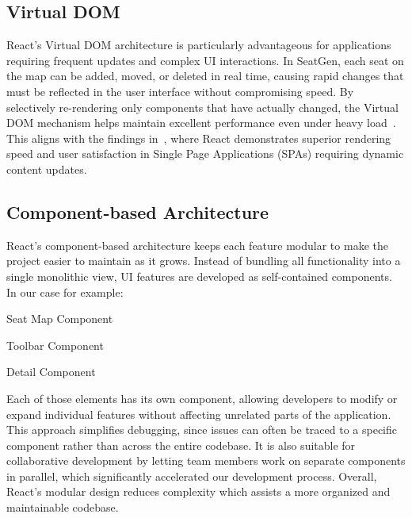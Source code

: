 \subsection{Virtual DOM}
React’s Virtual DOM architecture is particularly advantageous for applications requiring frequent updates and complex UI interactions. In SeatGen, each seat on the map can be added, moved, or deleted in real time, causing rapid changes that must be reflected in the user interface without compromising speed. By selectively re-rendering only components that have actually changed, the Virtual DOM mechanism helps maintain excellent performance even under heavy load~\cite{ReactVirtualDOM}. This aligns with the findings in~\cite{SPAComp}, where React demonstrates superior rendering speed and user satisfaction in Single Page Applications (SPAs) requiring dynamic content updates.

\subsection{Component-based Architecture}
React’s component-based architecture keeps each feature modular to make the project easier to maintain as it grows. Instead of bundling all functionality into a single monolithic view, UI features are developed as self-contained components. In our case for example:
\begin{compactitem}
    \item Seat Map Component
    \item Toolbar Component
    \item Detail Component
\end{compactitem}
Each of those elements has its own component, allowing developers to modify or expand individual features without affecting unrelated parts of the application. This approach simplifies debugging, since issues can often be traced to a specific component rather than across the entire codebase. It is also suitable for collaborative development by letting team members work on separate components in parallel, which significantly accelerated our development process. Overall, React’s modular design reduces complexity which assists a more organized and maintainable codebase.
~\cite{ReactCBA01, ReactCBA02, ReactCBA03}

